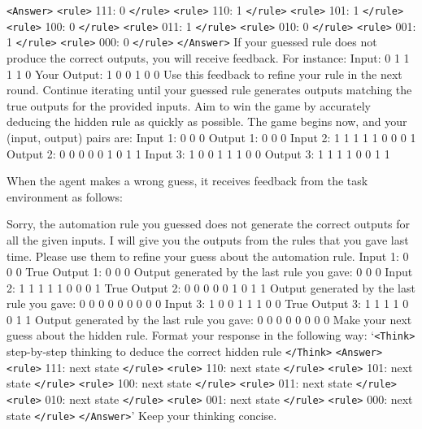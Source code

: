 \documentclass{article}
\theoremstyle{plain}
\theoremstyle{definition}
\theoremstyle{remark}
\begin{document}
\begin{tcolorbox}[colback=gray!20, colframe=black, title=Cellular Automata Agent Prompt]
\texttt{<Answer>}
\texttt{<rule>} 111: 0 \texttt{</rule>} \texttt{<rule>} 110: 1 \texttt{</rule>} \texttt{<rule>} 101: 1 \texttt{</rule>} \texttt{<rule>} 100: 0 \texttt{</rule>} \texttt{<rule>} 011: 1 \texttt{</rule>} \texttt{<rule>} 010: 0 \texttt{</rule>} \texttt{<rule>} 001: 1 \texttt{</rule>} \texttt{<rule>} 000: 0 \texttt{</rule>}
\texttt{</Answer>}
If your guessed rule does not produce the correct outputs, you will receive feedback. For instance:
Input: 0 1 1 1 1 0
Your Output: 1 0 0 1 0 0
Use this feedback to refine your rule in the next round. Continue iterating until your guessed rule generates outputs matching the true outputs for the provided inputs. Aim to win the game by accurately deducing the hidden rule as quickly as possible.
The game begins now, and your (input, output) pairs are:
Input 1: 0 0 0
Output 1: 0 0 0
Input 2: 1 1 1 1 1 0 0 0 1
Output 2: 0 0 0 0 0 1 0 1 1
Input 3: 1 0 0 1 1 1 0 0
Output 3: 1 1 1 1 0 0 1 1
\end{tcolorbox}
\newpage
When the agent makes a wrong guess, it receives feedback from the task environment as follows:
\begin{tcolorbox}[colback=gray!20, colframe=black, title=Cellular Automata Environment Feedback]
Sorry, the automation rule you guessed does not generate the correct outputs for all the given inputs. I will give you the outputs from the rules that you gave last time. Please use them to refine your guess about the automation rule.
Input 1: 0 0 0
True Output 1: 0 0 0
Output generated by the last rule you gave: 0 0 0
Input 2: 1 1 1 1 1 0 0 0 1
True Output 2: 0 0 0 0 0 1 0 1 1
Output generated by the last rule you gave: 0 0 0 0 0 0 0 0 0
Input 3: 1 0 0 1 1 1 0 0
True Output 3: 1 1 1 1 0 0 1 1
Output generated by the last rule you gave: 0 0 0 0 0 0 0 0
Make your next guess about the hidden rule. Format your response in the following way:
`\texttt{<Think>} step-by-step thinking to deduce the correct hidden rule \texttt{</Think>}
\texttt{<Answer>}
\texttt{<rule>} 111: next state \texttt{</rule>} \texttt{<rule>} 110: next state \texttt{</rule>} \texttt{<rule>} 101: next state \texttt{</rule>} \texttt{<rule>} 100: next state \texttt{</rule>} \texttt{<rule>} 011: next state \texttt{</rule>} \texttt{<rule>} 010: next state \texttt{</rule>} \texttt{<rule>} 001: next state \texttt{</rule>} \texttt{<rule>} 000: next state \texttt{</rule>}
\texttt{</Answer>}'
Keep your thinking concise.
\end{tcolorbox}
\newpage
\end{document}
